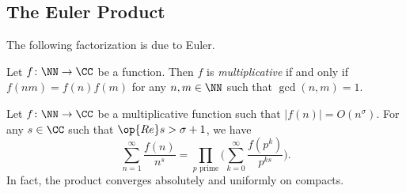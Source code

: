 \documentclass[../notes.tex]{subfiles}
\begin{document}
\subsection{The Euler Product}
The following factorization is due to Euler.
\begin{definition}[multiplicative]
	Let $f\colon\NN\to\CC$ be a function. Then $f$ is \textit{multiplicative} if and only if $f(nm)=f(n)f(m)$ for any $n,m\in\NN$ such that $\gcd(n,m)=1$.
\end{definition}
\begin{proposition} \label{prop:euler-factor}
	Let $f\colon\NN\to\CC$ be a multiplicative function such that $|f(n)|=O\left(n^\sigma\right)$. For any $s\in\CC$ such that $\op{Re}s>\sigma+1$, we have
	\[\sum_{n=1}^\infty\frac{f(n)}{n^s}=\prod_{p\text{ prime}}\Bigg(\sum_{k=0}^\infty\frac{f\left(p^k\right)}{p^{ks}}\Bigg).\]
	In fact, the product converges absolutely and uniformly on compacts.
\end{proposition}
\end{document}
